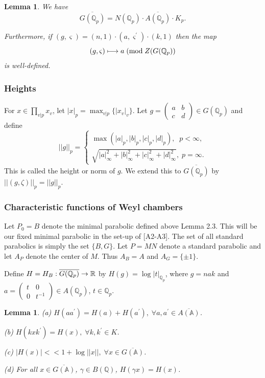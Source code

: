 \documentclass[amsfonts,12pt]{article}
\newtheorem{lemma}[theorem]{Lemma}
\def\aaa{\mathbb{A}}
\def\qqq{\mathbb{Q}}
\begin{document}
\begin{lemma}
We have 
\[
\overline{G(\qqq_p)}=N(\qqq_p)\cdot \overline{A(\qqq_p)}\cdot K_p.
\]

Furthermore, if $(g,\varsigma )=(n,1)\cdot (a,\varsigma ^{\prime })\cdot
(k,1)$ then the map 
\[
(g,\varsigma )\longmapsto a\;({\rm mod}\;Z(G(\qqq_p))
\]
is well-defined.
\end{lemma}

\subsubsection{Heights}

For $x\in \prod_{v|p}x_v$, let $|x|_p={\max }_{v | p}\{|x_v|_v\}$.
Let $g=\left( 
\begin{array}{cc}
a & b \\ 
c & d
\end{array}
\right) \in G(\qqq_p)$ and define 
\[
||g||_p=\left\{ 
\begin{array}{c}
\max (|a|_p,|b|_p,|c|_p,|d|_p),\;\;p<\infty , \\ 
\sqrt{|a|_\infty ^2+|b|_\infty ^2+|c|_\infty ^2+|d|_\infty ^2},\;p=\infty .
\end{array}
\right. 
\]
This is called the height or norm of $g$. We extend this to
$\overline{G({\qqq}_p)}$ by $||(g,\zeta)||_p=||g||_p$.

\subsubsection{Characteristic functions of Weyl chambers}

Let $P_0=B$ denote the minimal parabolic defined above Lemma 2.3.
This will be our fixed
minimal parabolic in the set-up of [A2-A3]. The set of all standard
parabolics is simply the set $\{B,G\}$. Let $P=MN$ denote a standard
parabolic and let $A_P$ denote the center of $M$. Thus $A_B=A$ and
$A_G=\{\pm 1\}$.

Define $H=H_B:\overline{G(\qqq_p)}\rightarrow \Bbb{R}$
by $H(g)=\log |t|_{\qqq_p}$, where $g=nak$ and $a=\left( 
\begin{array}{cc}
t & 0 \\ 
0 & t^{-1}
\end{array}
\right) \in A(\qqq_p)$, $t\in \qqq_p$.

\begin{lemma}
(a) $H(aa^{\prime })=H(a)+H(a^{\prime }),
\;\forall a,a^{\prime }\in \overline{A(\aaa )}$.

(b) $H(kxk^{\prime })=H(x),\;\forall k,k^{\prime }\in K$.

(c) $|H(x)|<<1+\log ||x||,\;\forall x\in \overline{G(\aaa )}$.

(d) For all $x\in \overline{G(\aaa )}$,
$\gamma \in B(\qqq)$, $H(\gamma x)=H(x)$.
\end{lemma}
\end{document}
